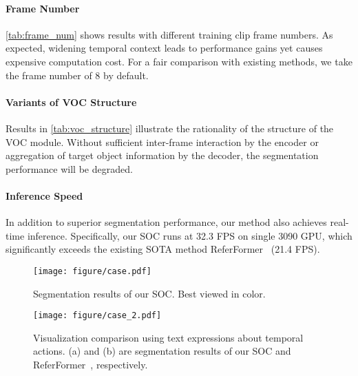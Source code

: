 \documentclass{article}
\begin{document}
\vspace{-5pt}
\paragraph{Frame Number}
\cref{tab:frame_num} shows results with different training clip frame numbers.
As expected, widening temporal context leads to performance gains yet causes expensive computation cost. For a fair comparison with existing methods, we take the frame number of 8 by default.

\vspace{-5pt}
\paragraph{Variants of VOC Structure}
Results in \cref{tab:voc_structure} illustrate the rationality of the structure of the VOC module. Without sufficient inter-frame interaction by the encoder or aggregation of target object information by the decoder, the segmentation performance will be degraded.

\vspace{-5pt}
\paragraph{Inference Speed}
In addition to superior segmentation performance, our method also achieves real-time inference. Specifically, our SOC runs at 32.3 FPS on single 3090 GPU, which significantly exceeds the existing SOTA method ReferFormer~\cite{referformer} (21.4 FPS).

\begin{figure*}
    \centering
    \texttt{[image: figure/case.pdf]}
    \vspace{-15pt}
    \caption{Segmentation results of our SOC. Best viewed in color.}
    \label{fig:case1}
\end{figure*}


\begin{figure*}
    \centering
    \texttt{[image: figure/case\_2.pdf]}
    \vspace{-15pt}
    \caption{Visualization comparison using text expressions about temporal actions. (a) and (b) are segmentation results of our SOC and ReferFormer~\cite{referformer}, respectively.}
    \label{fig:case2}
    \vspace{-10pt}
\end{figure*}
\end{document}
